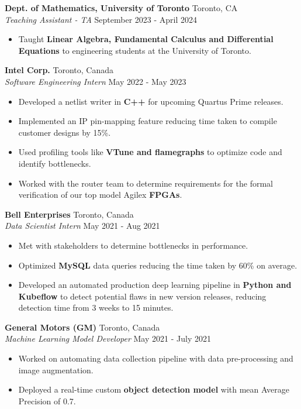 \documentclass[a4paper]{article}
\begin{document}
\textbf{Dept. of Mathematics, University of Toronto} \hfill Toronto, CA\\
\textit{Teaching Assistant - TA} \hfill September 2023 - April 2024\\
\vspace{-3mm}
\begin{itemize} \itemsep 0.5pt
	\item Taught \textbf{Linear Algebra, Fundamental Calculus and Differential Equations} to engineering students at the University of Toronto.
\end{itemize}

\textbf{Intel Corp.} \hfill Toronto, Canada\\
\textit{Software Engineering Intern} \hfill May 2022 - May 2023\\
\vspace{-3mm}
\begin{itemize} \itemsep 1pt
	\item Developed a netlist writer in \textbf{C++} for upcoming Quartus Prime releases.
	\item Implemented an IP pin-mapping feature reducing time taken to compile customer designs by 15\%.
	\item Used profiling tools like \textbf{VTune and flamegraphs} to optimize code and identify bottlenecks. 
	\item Worked with the router team to determine requirements for the formal verification of our top model Agilex \textbf{FPGAs}. 
\end{itemize}

\textbf{Bell Enterprises} \hfill Toronto, Canada\\
\textit{Data Scientist Intern} \hfill May 2021 - Aug 2021\\
\vspace{-3mm}
\begin{itemize} \itemsep 1pt
	\item Met with stakeholders to determine bottlenecks in performance. 
	\item Optimized \textbf{MySQL} data queries reducing the time taken by 60\% on average.
	\item Developed an automated production deep learning pipeline in \textbf{Python and Kubeflow} to detect potential flaws in new version releases, reducing detection time from 3 weeks to 15 minutes.
\end{itemize}

\textbf{General Motors (GM)} \hfill Toronto, Canada\\
\textit{Machine Learning Model Developer} \hfill May 2021 - July 2021\\
\vspace{-3mm}
\begin{itemize} \itemsep 1pt
	\item Worked on automating data collection pipeline with data pre-processing and image augmentation.
	\item Deployed a real-time custom \textbf{object detection model} with mean Average Precision of 0.7.
\end{itemize}
\end{document}
